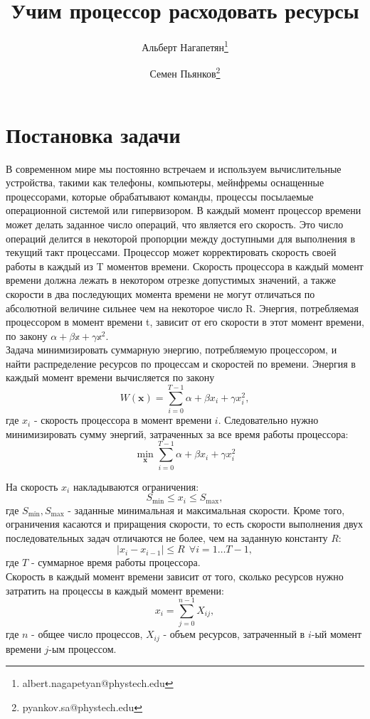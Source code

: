 \documentclass{article}
\title{Учим процессор расходовать ресурсы}
\author{Альберт Нагапетян\footnote{albert.nagapetyan@phystech.edu} \and Семен Пьянков\footnote{pyankov.sa@phystech.edu}}
\date{}
\begin{document}
\maketitle

\section{Постановка задачи}
В современном мире мы постоянно встречаем и используем  вычислительные устройства, такими как телефоны, компьютеры, мейнфремы оснащенные процессорами, которые обрабатывают команды, процессы посылаемые операционной системой или гипервизором. В каждый момент процессор времени может делать заданное число операций, что является его скорость. Это число операций делится в некоторой пропорции между доступными для выполнения в текущий такт процессами. Процессор может корректировать скорость своей работы в каждый из T моментов времени. Скорость процессора в каждый момент времени должна лежать в некотором отрезке допустимых значений, а также скорости в два последующих момента времени не могут отличаться по абсолютной величине сильнее чем на некоторое число R. Энергия, потребляемая процессором в момент времени t, зависит от его скорости в этот момент времени, по закону $\alpha + \beta \mathbb{x} + \gamma \mathbb{x}^2$. \\

Задача минимизировать суммарную энергию, потребляемую процессором, и найти распределение ресурсов по процессам и скоростей по времени.  
Энергия в каждый момент времени вычисляется по закону $$W(\mathbf{x}) = \sum\limits_{i=0}^{T-1} \alpha + \beta x_i + \gamma x_i^2,$$ где $x_i$ - скорость процессора в момент времени $i$. Следовательно нужно минимизировать сумму энергий, затраченных за все время работы процессора: $$\min \limits_{\textbf{x}} \sum \limits_{i=0}^{T-1} \alpha + \beta x_i + \gamma x_i^2$$

На скорость $x_i$ накладываются ограничения: $$S_{\min} \le x_i \le S_{\max},$$ где $S_{\min}, S_{\max}$ - заданные минимальная и максимальная скорости. Кроме того, ограничения касаются и приращения скорости, то есть скорости выполнения двух последовательных задач отличаются не более, чем на заданную константу $R$: $$|x_i-x_{i-1}| \le R ~~ \forall i = 1 \dots T-1,$$ где $T$ - суммарное время работы процессора. \\

Скорость в каждый момент времени зависит от того, сколько ресурсов нужно затратить на процессы в каждый момент времени:
$$x_i = \sum \limits_{j=0}^{n-1} X_{ij},$$ где $n$ - общее число процессов, $X_{ij}$ - объем ресурсов, затраченный в $i$-ый момент времени $j$-ым процессом.\\
\end{document}
